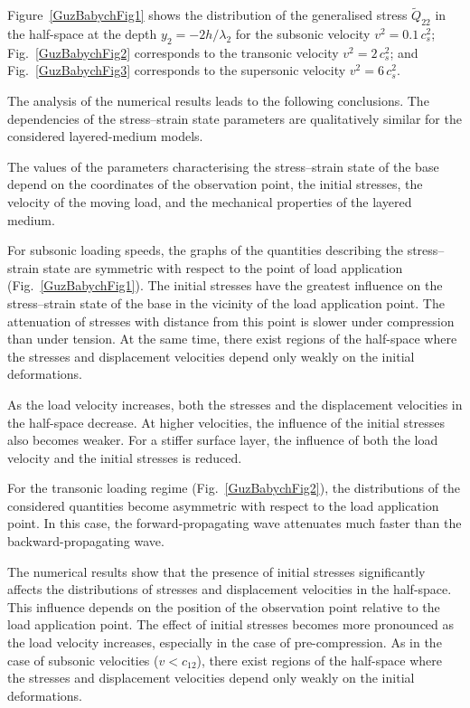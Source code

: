 Figure~\ref{GuzBabychFig1} shows the distribution of the generalised stress $\tilde{Q}_{22}$ in the half-space at the depth $y_{2}=-2h/\lambda_{2}$ for the subsonic velocity $v^{2}=0.1\,c_{s}^{2}$; Fig.~\ref{GuzBabychFig2} corresponds to the transonic velocity $v^{2}=2\,c_{s}^{2}$; and Fig.~\ref{GuzBabychFig3} corresponds to the supersonic velocity $v^{2}=6\,c_{s}^{2}$.


The analysis of the numerical results leads to the following conclusions. The dependencies of the stress–strain state parameters are qualitatively similar for the considered layered-medium models.


The values of the parameters characterising the stress--strain state of the base depend on the coordinates of the observation point, the initial stresses, the velocity of the moving load, and the mechanical properties of the layered medium.

For subsonic loading speeds, the graphs of the quantities describing the stress--strain state are symmetric with respect to the point of load application (Fig.~\ref{GuzBabychFig1}). The initial stresses have the greatest influence on the stress--strain state of the base in the vicinity of the load application point. The attenuation of stresses with distance from this point is slower under compression than under tension. At the same time, there exist regions of the half-space where the stresses and displacement velocities depend only weakly on the initial deformations.

As the load velocity increases, both the stresses and the displacement velocities in the half-space decrease. At higher velocities, the influence of the initial stresses also becomes weaker. For a stiffer surface layer, the influence of both the load velocity and the initial stresses is reduced.

For the transonic loading regime (Fig.~\ref{GuzBabychFig2}), the distributions of the considered quantities become asymmetric with respect to the load application point. In this case, the forward-propagating wave attenuates much faster than the backward-propagating wave.

The numerical results show that the presence of initial stresses significantly affects the distributions of stresses and displacement velocities in the half-space. This influence depends on the position of the observation point relative to the load application point. The effect of initial stresses becomes more pronounced as the load velocity increases, especially in the case of pre-compression. As in the case of subsonic velocities ($v<c_{12}$), there exist regions of the half-space where the stresses and displacement velocities depend only weakly on the initial deformations.

